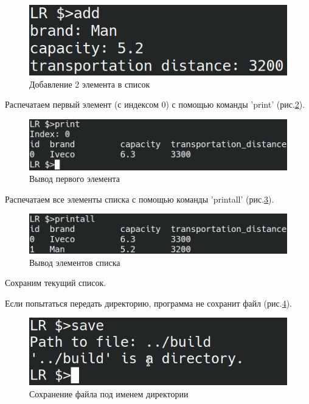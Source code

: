 \begin{figure}[H]
    \centering
    \includegraphics[width=0.9\linewidth]{photo/test.add2}
    \caption{Добавление 2 элемента в список}
    \label{test.add2}
\end{figure}

Распечатаем первый элемент (с индексом 0) с помощью команды 'print' (рис.\ref{test.print0}).

\begin{figure}[H]
    \centering
    \includegraphics[width=0.9\linewidth]{photo/test.print0}
    \caption{Вывод первого элемента}
    \label{test.print0}
\end{figure}

Распечатаем все элементы списка с помощью команды 'printall' (рис.\ref{test.printall}).

\begin{figure}[H]
    \centering
    \includegraphics[width=0.9\linewidth]{photo/test.printall}
    \caption{Вывод элементов списка}
    \label{test.printall}
\end{figure}

Сохраним текущий список.

Если попытаться передать директорию, программа не сохранит файл (рис.\ref{test.save.dir}).

\begin{figure}[H]
    \centering
    \includegraphics[width=0.9\linewidth]{photo/test.save.dir}
    \caption{Сохранение файла под именем директории}
    \label{test.save.dir}
\end{figure}

